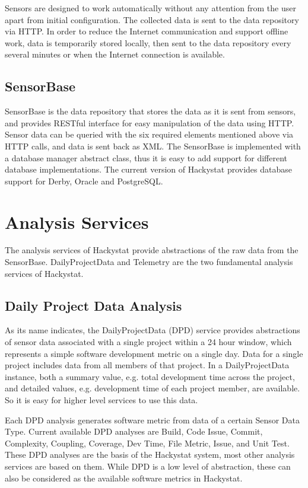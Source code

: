 Sensors are designed to work automatically without any attention from the user apart from initial configuration. The collected data is sent to the data repository via HTTP. In order to reduce the Internet communication and support offline work, data is temporarily stored locally, then sent to the data repository every several minutes or when the Internet connection is available.

\subsection{SensorBase}
SensorBase is the data repository that stores the data as it is sent from sensors, and provides RESTful interface for easy manipulation of the data using HTTP. Sensor data can be queried with the six required elements mentioned above via HTTP calls, and data is sent back as XML. The SensorBase is implemented with a database manager abstract class, thus it is easy to add support for different database implementations. The current version of Hackystat provides database support for Derby, Oracle and PostgreSQL.

\section{Analysis Services}
The analysis services of Hackystat provide abstractions of the raw data from the SensorBase. DailyProjectData and Telemetry are the two fundamental analysis services of Hackystat.

\subsection{Daily Project Data Analysis}
As its name indicates, the DailyProjectData (DPD) service provides abstractions of sensor data associated with a single project within a 24 hour window, which represents a simple software development metric on a single day. Data for a single project includes data from all members of that project. In a DailyProjectData instance, both a summary value, e.g. total development time across the project, and detailed values, e.g. development time of each project member, are available. So it is easy for higher level services to use this data.

Each DPD analysis generates software metric from data of a certain Sensor Data Type. Current available DPD analyses are Build, Code Issue, Commit, Complexity, Coupling, Coverage, Dev Time, File Metric, Issue, and Unit Test. These DPD analyses are the basis of the Hackystat system, most other analysis services are based on them. While DPD is a low level of abstraction, these can also be considered as the available software metrics in Hackystat.

